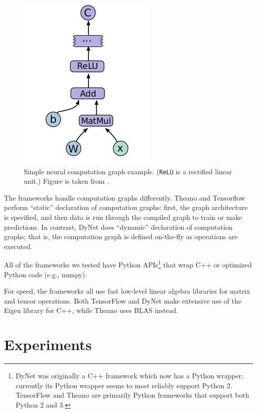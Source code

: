 \documentclass{article}
\begin{document}
\begin{figure}\begin{center}
\includegraphics[scale=.4]{graphics/tensorflowGraph.png}
\caption{\label{fig:compGraph}Simple neural computation graph example. (\texttt{ReLU} is a rectified linear unit.) Figure is taken from \protect\cite{tensorflow}.} 
\end{center}\end{figure}

The frameworks handle computation graphs differently. Theano and Tensorflow perform ``static'' declaration of computation graphs: first, the graph architecture is specified, and then data is run through the compiled graph to train or make predictions. In contrast, DyNet does ``dynamic'' declaration of computation graphs; that is, the computation graph is defined on-the-fly as operations are executed.

All of the frameworks we tested have Python APIs\footnote{DyNet was originally a C++ framework which now has a Python wrapper; currently its Python wrapper seems to most reliably support Python 2. TensorFlow and Theano are primarily Python frameworks that support both Python 2 and 3.} that wrap C++ or optimized Python code (e.g., numpy).

For speed, the frameworks all use fast low-level linear algebra libraries for matrix and tensor operations. Both TensorFlow and DyNet make extensive use of the Eigen library for C++, while Theano uses BLAS instead.


\section{Experiments}
\end{document}
